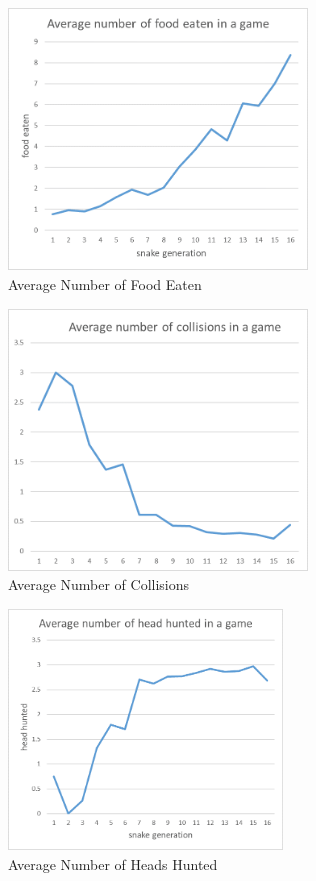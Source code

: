 ﻿\documentclass{article}
\begin{document}
\begin{figure}[!ht]
  \centering
  \includegraphics[width=300px]{food_eaten}
  \caption{Average Number of Food Eaten}
  \label{fig:food_eaten}
\end{figure}
\FloatBarrier

\begin{figure}[!ht]
  \centering
  \includegraphics[width=300px]{collisions}
  \caption{Average Number of Collisions}
  \label{fig:collisions}
\end{figure}
\FloatBarrier

\begin{figure}[!ht]
  \centering
  \includegraphics[width=275px]{heads_hunted}
  \caption{Average Number of Heads Hunted}
  \label{fig:heads_hunted}
\end{figure}
\FloatBarrier
\end{document}
